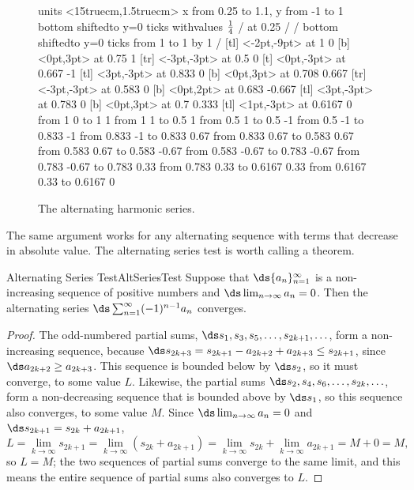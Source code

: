\begin{figure}[H]
\centerline{
\vbox{\beginpicture
\normalgraphs
\setcoordinatesystem units <15truecm,1.5truecm>
\setplotarea x from 0.25 to 1.1, y from -1 to 1
\axis bottom shiftedto y=0 ticks withvalues {$1\over4$} / at 0.25 / /
\axis bottom shiftedto y=0 ticks from 1 to 1 by 1 /
 [tl] <-2pt,-9pt> at 1 0
 [b] <0pt,3pt> at 0.75 1
 [tr] <-3pt,-3pt> at 0.5 0
 [t] <0pt,-3pt> at 0.667 -1
 [tl] <3pt,-3pt> at 0.833 0
 [b] <0pt,3pt> at 0.708 0.667
 [tr] <-3pt,-3pt> at 0.583 0
 [b] <0pt,2pt> at 0.683 -0.667
 [tl] <3pt,-3pt> at 0.783 0
 [b] <0pt,3pt> at 0.7 0.333
 [tl] <1pt,-3pt> at 0.6167 0
\putrule from 1 0 to 1 1
\arrow <4pt> [0.35, 1] from 1 1 to 0.5 1
\putrule from 0.5 1 to 0.5 -1
\arrow <4pt> [0.35, 1] from 0.5 -1 to 0.833 -1
\putrule from 0.833 -1 to 0.833 0.67
\arrow <4pt> [0.35, 1] from 0.833 0.67 to 0.583 0.67
\putrule from 0.583 0.67 to 0.583 -0.67
\arrow <4pt> [0.35, 1] from 0.583 -0.67 to 0.783 -0.67
\putrule from  0.783 -0.67 to  0.783 0.33
\arrow <4pt> [0.35, 1] from 0.783 0.33 to 0.6167 0.33
\putrule from  0.6167 0.33 to  0.6167 0
\endpicture}}
\caption{The alternating harmonic series.}
\label{fig:alternating harmonic series}
\end{figure}

The same argument works for any alternating sequence with terms that decrease in absolute value.
The alternating series test is worth calling a theorem.

\begin{theorem}{Alternating Series Test}{AltSeriesTest}
Suppose that $\ds\{a_n\}_{n=1}^\infty$ is a non-increasing
sequence of positive numbers and $\ds\lim_{n\to\infty}a_n=0$. Then the
alternating series $\ds\sum_{n=1}^\infty (-1)^{n-1} a_n$ converges.
\end{theorem}
\begin{proof}
The odd-numbered partial sums, $\ds s_1, s_3, s_5,\ldots, s_{2k+1},\ldots$,
form a non-increasing sequence, because
$\ds s_{2k+3}=s_{2k+1}-a_{2k+2}+a_{2k+3}\le s_{2k+1}$, since
$\ds a_{2k+2}\ge a_{2k+3}$. This sequence is bounded below by
$\ds s_2$, so it must converge, to some value $L$.
Likewise, the partial sums $\ds s_2, s_4, s_6,\ldots,s_{2k},\ldots$,
form a non-decreasing sequence that is bounded above by
$\ds s_1$, so this sequence also converges, to some value $M$.
Since $\ds\lim_{n\to\infty} a_n=0$ and
$\ds s_{2k+1}= s_{2k}+a_{2k+1}$,
$$
  L=\lim_{k\to\infty}s_{2k+1}=\lim_{k\to\infty}(s_{2k}+a_{2k+1})=
  \lim_{k\to\infty}s_{2k}+\lim_{k\to\infty}a_{2k+1}=M+0=M,
$$
so $L=M$; the two sequences of partial sums converge to the same
limit, and this means the entire sequence of partial sums also
converges to $L$.
\end{proof}

